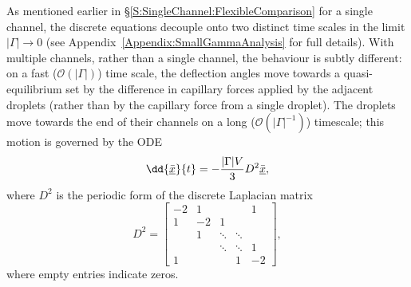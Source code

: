 As mentioned earlier in \S\ref{S:SingleChannel:FlexibleComparison} for a single channel,  the discrete equations decouple onto two distinct time scales in the limit $|\Gamma| \to 0$ (see Appendix~\ref{Appendix:SmallGammaAnalysis} for full details). With multiple channels, rather than a single channel, the behaviour is subtly different: on a fast ($\mathcal{O}(|\Gamma|)$) time scale, the deflection angles move towards a quasi-equilibrium set by the difference in capillary forces applied by the adjacent droplets (rather than by the capillary force from a single droplet).  The droplets move towards the end of their channels on a long ($\mathcal{O}(|\Gamma|^{-1})$) timescale; this motion is governed by the ODE
\begin{equation}\label{E:ClusterSizes:SmallGamma:LongTimescaleEquation}
\dd{\underline{\xbar}}{t} = -\frac{|\Gamma|V}{3}D^2 \underline{\xbar},
\end{equation}
where $D^2$ is the periodic form of the discrete Laplacian matrix
\begin{equation}\label{E:ClusterSizes:SmallGamma:LongTimescaleMatrix}
D^2=  \begin{bmatrix}
-2 & 1   & & & 1 \\
1 & -2 & 1  \\
 & 1 & \ddots & \ddots \\
& & \ddots & \ddots & 1 \\
1& & &1&- 2
\end{bmatrix},
\end{equation}
where empty entries indicate zeros.

